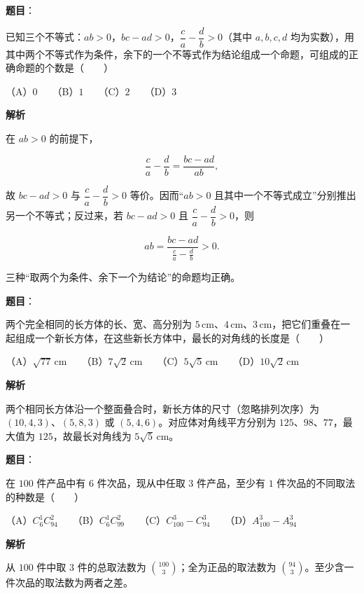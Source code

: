 \begin{answer}

\textbf{题目}：

已知三个不等式：$ab>0$，$bc-ad>0$，$\dfrac{c}{a}-\dfrac{d}{b}>0$（其中 $a,b,c,d$ 均为实数），用其中两个不等式作为条件，余下的一个不等式作为结论组成一个命题，可组成的正确命题的个数是\mbox{（　　）}

（A）$0$　　（B）$1$　　（C）$2$　　（D）$3$

\textbf{解析}

在 $ab>0$ 的前提下，

\nopagebreak[4]
\[
\frac ca-\frac db=\frac{bc-ad}{ab},
\]

故 $bc-ad>0$ 与 $\dfrac ca-\dfrac db>0$ 等价。因而“$ab>0$ 且其中一个不等式成立”分别推出另一个不等式；反过来，若 $bc-ad>0$ 且 $\dfrac ca-\dfrac db>0$，则

\nopagebreak[4]
\[
ab=\frac{bc-ad}{\frac ca-\frac db}>0.
\]

三种“取两个为条件、余下一个为结论”的命题均正确。


\end{answer}
\begin{answer}

\textbf{题目}：

两个完全相同的长方体的长、宽、高分别为 $5\,\text{cm}$、$4\,\text{cm}$、$3\,\text{cm}$，把它们重叠在一起组成一个新长方体，在这些新长方体中，最长的对角线的长度是\mbox{（　　）}

（A）$\sqrt{77}\,\text{cm}$　　（B）$7\sqrt2\,\text{cm}$　　（C）$5\sqrt5\,\text{cm}$　　（D）$10\sqrt2\,\text{cm}$

\textbf{解析}

两个相同长方体沿一个整面叠合时，新长方体的尺寸（忽略排列次序）为 $(10,4,3)$、$(5,8,3)$ 或 $(5,4,6)$。对应体对角线平方分别为 $125$、$98$、$77$，最大值为 $125$，故最长对角线为 $5\sqrt5\,\text{cm}$。


\end{answer}
\begin{answer}

\textbf{题目}：

在 $100$ 件产品中有 $6$ 件次品，现从中任取 $3$ 件产品，至少有 $1$ 件次品的不同取法的种数是\mbox{（　　）}

（A）$C_6^1C_{94}^2$　　（B）$C_6^1C_{99}^2$　　（C）$C_{100}^3-C_{94}^3$　　（D）$A_{100}^3-A_{94}^3$

\textbf{解析}

从 $100$ 件中取 $3$ 件的总取法数为 $\binom{100}{3}$；全为正品的取法数为 $\binom{94}{3}$。至少含一件次品的取法数为两者之差。


\end{answer}
